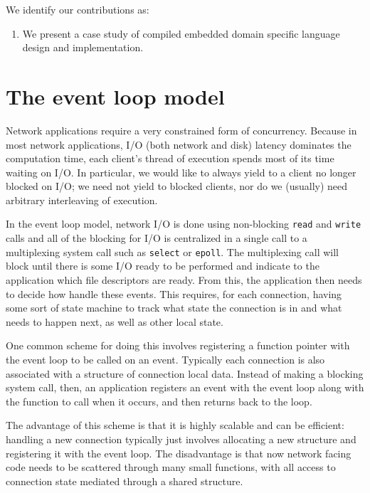 \documentclass[preprint]{sigplanconf}
\renewcommand{\t}{\texttt}
\begin{document}
\cite{*}

We identify our contributions as:
\begin{enumerate}

\item We present a case study of compiled embedded domain specific
  language design and implementation.
\end{enumerate}

\section{The event loop model}

Network applications require a very constrained form of
concurrency. Because in most network applications, I/O (both network
and disk) latency dominates the computation time, each client's thread
of execution spends most of its time waiting on I/O. In particular, we
would like to always yield to a client no longer blocked on I/O; we
need not yield to blocked clients, nor do we (usually) need arbitrary
interleaving of execution.

In the event loop model, network I/O is done using non-blocking
\t{read} and \t{write} calls and all of the blocking for I/O is
centralized in a single call to a multiplexing system call such as
\t{select} or \t{epoll}. The multiplexing call will block until there
is some I/O ready to be performed and indicate to the application
which file descriptors are ready. From this, the application then
needs to decide how handle these events. This requires, for each
connection, having some sort of state machine to track what state the
connection is in and what needs to happen next, as well as other local
state.

One common scheme for doing this involves registering a function
pointer with the event loop to be called on an event. Typically each
connection is also associated with a structure of connection local
data. Instead of making a blocking system call, then, an application
registers an event with the event loop along with the function to call
when it occurs, and then returns back to the loop.

The advantage of this scheme is that it is highly scalable and can be
efficient: handling a new connection typically just involves
allocating a new structure and registering it with the event loop. The
disadvantage is that now network facing code needs to be scattered
through many small functions, with all access to connection state
mediated through a shared structure.
\end{document}

